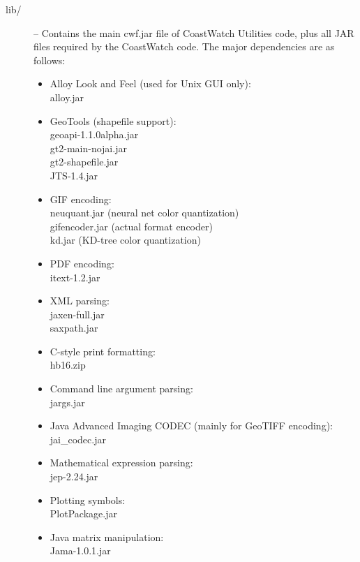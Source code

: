 {\begin{description}
\item[{\file lib/}] -- Contains the main {\file cwf.jar} file of
CoastWatch Utilities code, plus all JAR files required by the
CoastWatch code.  The major dependencies are as follows:
\begin{itemize}

\item Alloy Look and Feel (used for Unix GUI only):\\
{\file alloy.jar}

\item GeoTools (shapefile support):\\
{\file geoapi-1.1.0alpha.jar}\\
{\file gt2-main-nojai.jar}\\
{\file gt2-shapefile.jar}\\
{\file JTS-1.4.jar}

\item GIF encoding: \\
{\file neuquant.jar} (neural net color quantization) \\
{\file gifencoder.jar} (actual format encoder) \\
{\file kd.jar} (KD-tree color quantization)

\item PDF encoding: \\
{\file itext-1.2.jar}

\item XML parsing: \\
{\file jaxen-full.jar} \\
{\file saxpath.jar}

\item C-style print formatting:\\
{\file hb16.zip}

\item Command line argument parsing:\\
{\file jargs.jar}

\item Java Advanced Imaging CODEC (mainly for GeoTIFF encoding):\\
{\file jai\_codec.jar}

\item Mathematical expression parsing:\\
{\file jep-2.24.jar}

\item Plotting symbols:\\
{\file PlotPackage.jar}

\item Java matrix manipulation:\\
{\file Jama-1.0.1.jar}


\end{itemize}
\end{description}}
